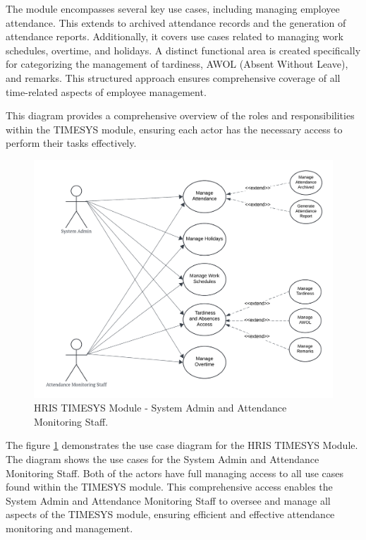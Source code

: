     The module encompasses several key use cases, including managing employee attendance. This extends to archived attendance records and the generation of attendance reports. Additionally, it covers use cases related to managing work schedules, overtime, and holidays. A distinct functional area is created specifically for categorizing the management of tardiness, AWOL (Absent Without Leave), and remarks. This structured approach ensures comprehensive coverage of all time-related aspects of employee management.

    This diagram provides a comprehensive overview of the roles and responsibilities within the TIMESYS module, ensuring each actor has the necessary access to perform their tasks effectively.
    
    \begin{figure}[H]
        \centering
        \includegraphics[width=0.9\linewidth]{figures/images/diagrams/usecase/use-case-time-1.png}
        \caption{HRIS TIMESYS Module - System Admin and Attendance Monitoring Staff.}
        \label{fig:use-case-time-1}
    \end{figure}

    The figure \ref{fig:use-case-time-1} demonstrates the use case diagram for the HRIS TIMESYS Module. The diagram shows the use cases for the System Admin and Attendance Monitoring Staff. Both of the actors have full managing access to all use cases found within the TIMESYS module. This comprehensive access enables the System Admin and Attendance Monitoring Staff to oversee and manage all aspects of the TIMESYS module, ensuring efficient and effective attendance monitoring and management.

